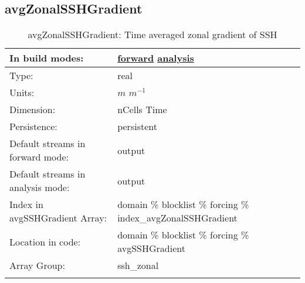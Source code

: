 \subsection[avgZonalSSHGradient]{avgZonalSSHGradient}
\label{subsec:var_sec_forcing_avgZonalSSHGradient}
\begin{center}
\begin{longtable}{| p{2.0in} | p{4.0in} |}
        \hline 
        In build modes: & \hyperref[subsec:forward_var_tab_forcing]{forward} \hyperref[subsec:analysis_var_tab_forcing]{analysis} \\
        \hline 
        Type: & real \\
        \hline 
        Units: & $m$ $m^{-1}$ \\
        \hline 
        Dimension: & nCells Time \\
        \hline 
        Persistence: & persistent \\
        \hline 
		 Default streams in forward mode: &  output \\
        \hline 
		 Default streams in analysis mode: &  output \\
        \hline 
		 Index in avgSSHGradient Array: & domain \% blocklist \% forcing \% index\_avgZonalSSHGradient \\
		 \hline 
		 Location in code: & domain \% blocklist \% forcing \% avgSSHGradient \\
		 \hline 
		 Array Group: & ssh\_zonal \\
		 \hline 
    \caption{avgZonalSSHGradient: Time averaged zonal gradient of SSH}
\end{longtable}
\end{center}
